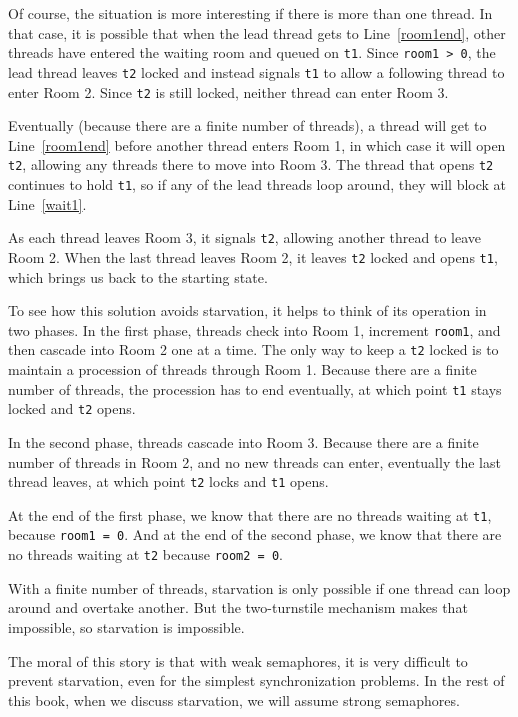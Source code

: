 \documentclass{book}
\begin{document}
Of course, the situation is more interesting if there is more than one
thread.  In that case, it is possible that when the lead thread gets
to Line~\ref{room1end}, other threads have entered the waiting room
and queued on {\tt t1}.  Since {\tt room1 > 0}, the lead thread leaves
{\tt t2} locked and instead signals {\tt t1} to allow a following
thread to enter Room 2.  Since {\tt t2} is still locked, neither
thread can enter Room 3.

Eventually (because there are a finite number of threads), a thread
will get to Line~\ref{room1end} before another thread enters Room 1, in which
case it will open {\tt t2}, allowing any threads there to move into
Room 3.  The thread that opens {\tt t2} continues to hold {\tt t1}, so
if any of the lead threads loop around, they will block at Line~\ref{wait1}.

As each thread leaves Room 3, it signals {\tt t2}, allowing another
thread to leave Room 2.  When the last thread leaves Room 2, it leaves
{\tt t2} locked and opens {\tt t1}, which brings us back to the
starting state.

To see how this solution avoids starvation, it helps to think of its
operation in two phases.  In the first phase, threads check into Room
1, increment {\tt room1}, and then cascade into Room 2 one at a time.
The only way to keep a {\tt t2} locked is to maintain a
procession of threads through Room 1.  Because there are a finite
number of threads, the procession has to end eventually, at which
point {\tt t1} stays locked and {\tt t2} opens.

In the second phase, threads cascade into Room 3.  
Because there are a finite number of threads in Room 2, and
no new threads can enter, eventually the last thread leaves, at
which point {\tt t2} locks and {\tt t1} opens.

At the end of the first phase, we know that there are no threads
waiting at {\tt t1}, because {\tt room1 = 0}.  And at the end of the
second phase, we know that there are no threads waiting at {\tt t2}
because {\tt room2 = 0}.

With a finite number of threads, starvation is only possible if one
thread can loop around and overtake another.  But the two-turnstile
mechanism makes that impossible, so starvation is impossible.

The moral of this story is that with weak semaphores, it is very
difficult to prevent starvation, even for the simplest synchronization
problems.  In the rest of this book, when we discuss starvation, we
will assume strong semaphores.
\end{document}
